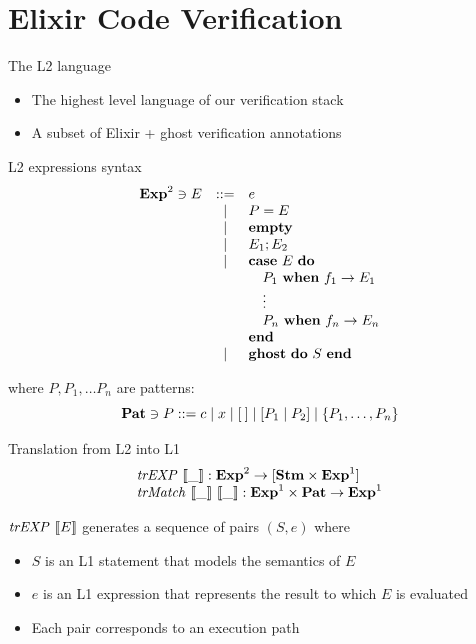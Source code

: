 \documentclass{beamer}
\begin{document}
  \section{Elixir Code Verification}
  \begin{frame}{The L2 language}
    \begin{itemize}
      \item \pause The highest level language of our verification stack
      \item \pause A subset of Elixir + ghost verification annotations
    \end{itemize}
  \end{frame}
  \begin{frame}{L2 expressions syntax}
    \[
      \begin{array}{rcll}
      \mathbf{Exp}^{2} \ni E & ::= & e \\
      & | & P = E \\
      & | & \textbf{empty} \\
      & | & E_1; E_2 \\
      & | & \textbf{case}~E~\textbf{do} \\
      & & \quad P_1~\textbf{when}~f_1 \rightarrow E_1 \\
      & & \quad \vdots\\
      & & \quad P_n~\textbf{when}~f_n \rightarrow E_n \\
      & & \textbf{end} \\
      & | & \textbf{ghost}~\textbf{do}~S~\textbf{end} \\
      \end{array}
    \]

    \pause where $P, P_1, \dots P_n$ are patterns:
    \[
      \mathbf{Pat} \ni P ::= c \mid x \mid [\:] \mid [P_1 \mid P_2] \mid \{ P_1, \ldots, P_n \}
    \]
  \end{frame}
  \begin{frame}{Translation from L2 into L1}
    \[
      \begin{array}{ll}
        \mathit{trEXP}~\llbracket\_\rrbracket : \mathbf{Exp}^{2} \rightarrow [\mathbf{Stm} \times \mathbf{Exp}^{1}]\\
        \mathit{trMatch}~\llbracket\_\rrbracket~\llbracket\_\rrbracket : \mathbf{Exp}^{1} \times \mathbf{Pat} \rightarrow \mathbf{Exp}^{1}
      \end{array}
    \]

    \pause $\mathit{trEXP}~\llbracket E\rrbracket$ generates a sequence of pairs $(S, e)$ where
    \begin{itemize}
      \item \pause $S$ is an L1 statement that models the semantics of $E$
      \item \pause $e$ is an L1 expression that represents the result to which $E$ is evaluated
      \item \pause Each pair corresponds to an execution path
    \end{itemize}
  \end{frame}
\end{document}
